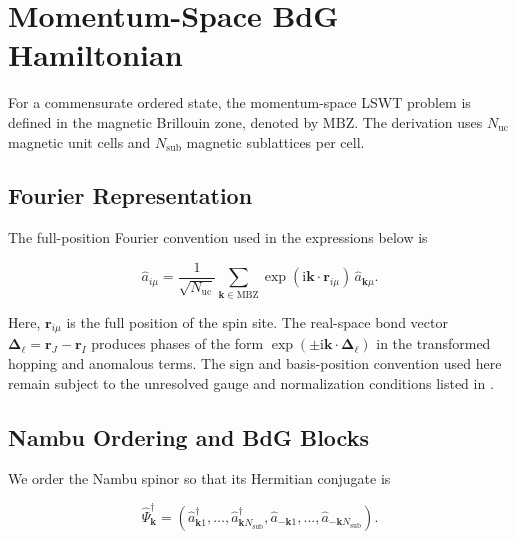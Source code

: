 
\hypertarget{sec-lswt-momentum-space-bdg-hamiltonian}{%
\section{Momentum-Space BdG Hamiltonian}\label{sec-lswt-momentum-space-bdg-hamiltonian}}

For a commensurate ordered state, the momentum-space LSWT problem is defined in the magnetic Brillouin zone, denoted by \(\mathrm{MBZ}\). The derivation uses \(N_{\mathrm{uc}}\) magnetic unit cells and \(N_{\mathrm{sub}}\) magnetic sublattices per cell.

\subsection{Fourier Representation}

The full-position Fourier convention used in the expressions below is

\[
\hat a_{i\mu}
=\frac{1}{\sqrt{N_{\mathrm{uc}}}}
\sum_{\mathbf k\in\mathrm{MBZ}}
\exp(\mathrm i\mathbf k\cdot\mathbf r_{i\mu})\,
\hat a_{\mathbf k\mu}.
\]

Here, \(\mathbf r_{i\mu}\) is the full position of the spin site. The real-space bond vector \(\boldsymbol\Delta_\ell=\mathbf r_J-\mathbf r_I\) produces phases of the form \(\exp(\pm\mathrm i\mathbf k\cdot\boldsymbol\Delta_\ell)\) in the transformed hopping and anomalous terms. The sign and basis-position convention used here remain subject to the unresolved gauge and normalization conditions listed in .

\subsection{Nambu Ordering and BdG Blocks}

We order the Nambu spinor so that its Hermitian conjugate is

\[
\hat\Psi_{\mathbf k}^\dagger
=\left(
\hat a_{\mathbf k1}^\dagger,\ldots,
\hat a_{\mathbf k N_{\mathrm{sub}}}^\dagger,
\hat a_{-\mathbf k1},\ldots,
\hat a_{-\mathbf k N_{\mathrm{sub}}}
\right).
\]

